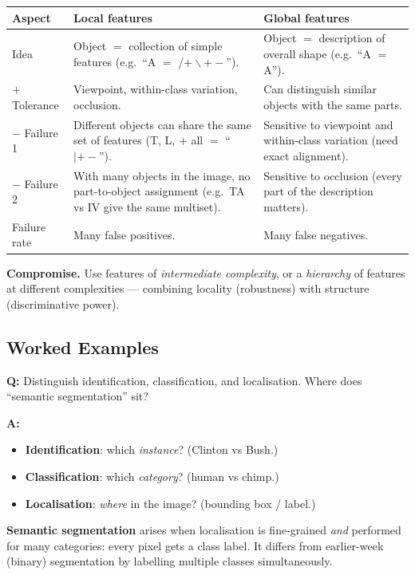 \begin{center}
\renewcommand{\arraystretch}{1.3}
\begin{tabular}{@{} l p{4.5cm} p{5cm} @{}}
\toprule
\textbf{Aspect} & \textbf{Local features} & \textbf{Global features} \\
\midrule
Idea & Object $=$ collection of simple features (e.g.\ ``A $=$ /$+\backslash +-$''). & Object $=$ description of overall shape (e.g.\ ``A $=$ A''). \\
$+$ Tolerance & Viewpoint, within-class variation, occlusion. & Can distinguish similar objects with the same parts. \\
$-$ Failure 1 & Different objects can share the same set of features (T, L, $+$ all $=$ ``$|+-$''). & Sensitive to viewpoint and within-class variation (need exact alignment). \\
$-$ Failure 2 & With many objects in the image, no part-to-object assignment (e.g.\ TA vs IV give the same multiset). & Sensitive to occlusion (every part of the description matters). \\
Failure rate & Many false positives. & Many false negatives. \\
\bottomrule
\end{tabular}
\end{center}

\textbf{Compromise.} Use features of \emph{intermediate complexity}, or a \emph{hierarchy} of features at different complexities — combining locality (robustness) with structure (discriminative power).

\bigseparator

\subsection{Worked Examples}

\begin{exbox}
\textbf{Q:} Distinguish identification, classification, and localisation. Where does ``semantic segmentation'' sit?

\textbf{A:}
\begin{itemize}
  \item \textbf{Identification}: which \emph{instance}? (Clinton vs Bush.)
  \item \textbf{Classification}: which \emph{category}? (human vs chimp.)
  \item \textbf{Localisation}: \emph{where} in the image? (bounding box / label.)
\end{itemize}
\textbf{Semantic segmentation} arises when localisation is fine-grained \emph{and} performed for many categories: every pixel gets a class label. It differs from earlier-week (binary) segmentation by labelling multiple classes simultaneously.
\end{exbox}

